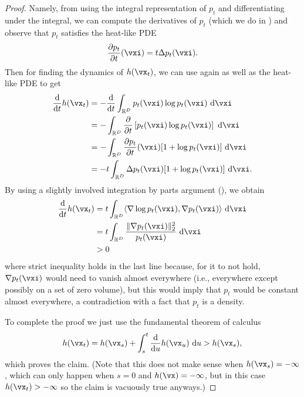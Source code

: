 \documentclass[../../book-main.tex]{subfiles}
\begin{document}
\begin{proof}
    Namely, from using the integral representation of \(p_{t}\) and differentiating under the integral, we can compute the derivatives of \(p_{t}\) (which we do in ) and observe that \(p_{t}\) satisfies the heat-like PDE
    \begin{equation}
        \pdv{p_{t}}{t}(\vxi) = t\Delta p_{t}(\vxi).
    \end{equation}
    Then for finding the dynamics of \(h(\vx_{t})\), we can use  again as well as the heat-like PDE to get
    \begin{align}
        \odv*{h(\vx_{t})}{t}
        &= -\odv*{\int_{\R^{D}}p_{t}(\vxi)\log p_{t}(\vxi)\odif{\vxi}}{t} \\
        &= -\int_{\R^{D}}\pdv*{\bs{p_{t}(\vxi)\log p_{t}(\vxi)}}{t}\odif{\vxi} \\
        &= -\int_{\R^{D}}\pdv{p_{t}}{t}(\vxi)[1 + \log p_{t}(\vxi)]\odif{\vxi} \\
        &= -t\int_{\R^{D}}\Delta p_{t}(\vxi)[1 + \log p_{t}(\vxi)]\odif{\vxi}.
    \end{align}
    By using a slightly involved integration by parts argument (), we obtain 
    \begin{align}
        \odv*{h(\vx_{t})}{t}
        &= t\int_{\R^{D}}\ip{\nabla \log p_{t}(\vxi)}{\nabla p_{t}(\vxi)}\odif{\vxi} \\
        &= t\int_{\R^{D}}\frac{\norm{\nabla p_{t}(\vxi)}_{2}^{2}}{p_{t}(\vxi)}\odif{\vxi} \\
        &> 0
    \end{align}
    where strict inequality holds in the last line because, for it to not hold, \(\nabla p_{t}(\vxi)\) would need to vanish almost everywhere (i.e., everywhere except possibly on a set of zero volume), but this would imply that \(p_{t}\) would be constant almost everywhere, a contradiction with a fact that \(p_{t}\) is a density.

    To complete the proof we just use the fundamental theorem of calculus
    \begin{equation}
        h(\vx_{t}) = h(\vx_{s}) + \int_{s}^{t}\odv*{h(\vx_{u})}{u}\odif{u} > h(\vx_{s}),
    \end{equation}
    which proves the claim. (Note that this does not make sense when \(h(\vx_{s}) = -\infty\), which can only happen when \(s = 0\) and \(h(\vx) = -\infty\), but in this case \(h(\vx_{t}) > -\infty\) so the claim is vacuously true anyways.)
\end{proof}
\end{document}
